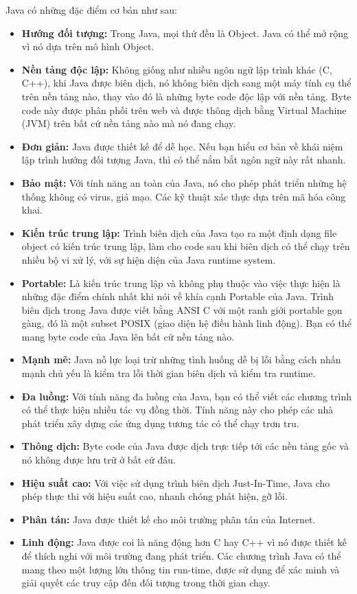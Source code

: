 Java có những đặc điểm cơ bản như sau:
\begin{itemize}
    \item \textbf{Hướng đối tượng:} Trong Java, mọi thứ đều là Object. Java có thể mở rộng vì nó dựa trên mô hình Object.
    \item \textbf{Nền tảng độc lập:} Không giống như nhiều ngôn ngữ lập trình khác (C, C++), khi Java được biên dịch, nó không biên dịch sang một máy tính cụ thể trên nền tảng nào, thay vào đó là những byte code độc lập với nền tảng. Byte code này được phân phối trên web và được thông dịch bằng Virtual Machine (JVM) trên bất cứ nền tảng nào mà nó đang chạy.
    \item \textbf{Đơn giản:} Java được thiết kế để dễ học. Nếu bạn hiểu cơ bản về khái niệm lập trình hướng đối tượng Java, thì có thể nắm bắt ngôn ngữ này rất nhanh.
    \item \textbf{Bảo mật:} Với tính năng an toàn của Java, nó cho phép phát triển những hệ thống không có virus, giả mạo. Các kỹ thuật xác thực dựa trên mã hóa công khai.
    \item \textbf{Kiến trúc trung lập:} Trình biên dịch của Java tạo ra một định dạng file object có kiến trúc trung lập, làm cho code sau khi biên dịch có thể chạy trên nhiều bộ vi xử lý, với sự hiện diện của Java runtime system.
    \item \textbf{Portable:} Là kiến trúc trung lập và không phụ thuộc vào việc thực hiện là những đặc điểm chính nhất khi nói về khía cạnh Portable của Java. Trình biên dịch trong Java được viết bằng ANSI C với một ranh giới portable gọn gàng, đó là một subset POSIX (giao diện hệ điều hành linh động). Bạn có thể mang byte code của Java lên bất cứ nền tảng nào.
    \item \textbf{Mạnh mẽ:} Java nỗ lực loại trừ những tình huống dễ bị lỗi bằng cách nhấn mạnh chủ yếu là kiểm tra lỗi thời gian biên dịch và kiểm tra runtime.
    \item \textbf{Đa luồng:} Với tính năng đa luồng của Java, bạn có thể viết các chương trình có thể thực hiện nhiều tác vụ đồng thời. Tính năng này cho phép các nhà phát triển xây dựng các ứng dụng tương tác có thể chạy trơn tru.
    \item \textbf{Thông dịch:} Byte code của Java được dịch trực tiếp tới các nền tảng gốc và nó không được lưu trữ ở bất cứ đâu. 
    \item \textbf{Hiệu suất cao:} Với việc sử dụng trình biên dịch Just-In-Time, Java cho phép thực thi với hiệu suất cao, nhanh chóng phát hiện, gỡ lỗi.
    \item \textbf{Phân tán:} Java được thiết kế cho môi trường phân tán của Internet.
    \item \textbf{Linh động:} Java được coi là năng động hơn C hay C++ vì nó được thiết kế để thích nghi với môi trường đang phát triển. Các chương trình Java có thể mang theo một lượng lớn thông tin run-time, được sử dụng để xác minh và giải quyết các truy cập đến đối tượng trong thời gian chạy.
\end{itemize}
